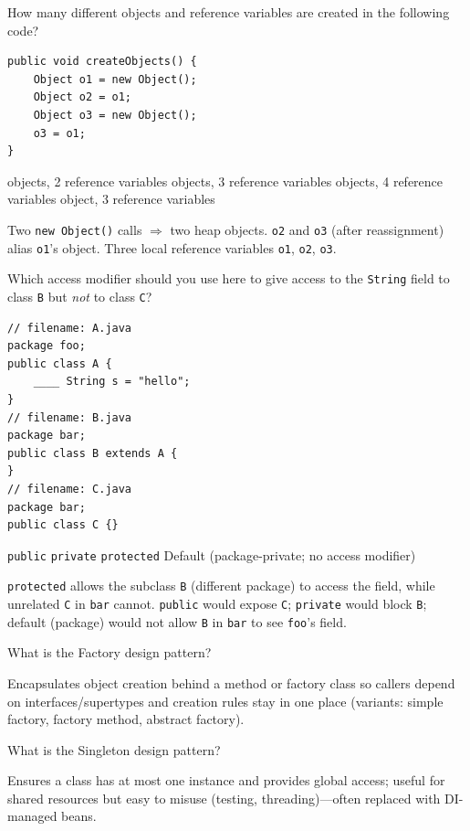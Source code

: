 \question[4]
How many different objects and reference variables are created in the following code?
\begin{lstlisting}[style=java]
public void createObjects() {
    Object o1 = new Object();
    Object o2 = o1;
    Object o3 = new Object();
    o3 = o1;
}
\end{lstlisting}
\begin{choices}
   objects, 2 reference variables
   objects, 3 reference variables
   objects, 4 reference variables
   object, 3 reference variables
\end{choices}
\begin{solution}
  Two \texttt{new Object()} calls $\Rightarrow$ two heap objects. \texttt{o2} and \texttt{o3} (after reassignment) alias \texttt{o1}'s object. Three local reference variables \texttt{o1}, \texttt{o2}, \texttt{o3}.
\end{solution}

\question[4]
Which access modifier should you use here to give access to the \texttt{String} field to class \texttt{B} but \emph{not} to class \texttt{C}?
\begin{lstlisting}[style=java]
// filename: A.java
package foo;
public class A {
    ____ String s = "hello";
}
// filename: B.java
package bar;
public class B extends A {
}
// filename: C.java
package bar;
public class C {}
\end{lstlisting}
\begin{choices}
  \choice \texttt{public}
  \choice \texttt{private}
  \CorrectChoice \texttt{protected}
  \choice Default (package-private; no access modifier)
\end{choices}
\begin{solution}
  \texttt{protected} allows the subclass \texttt{B} (different package) to access the field, while unrelated \texttt{C} in \texttt{bar} cannot. \texttt{public} would expose \texttt{C}; \texttt{private} would block \texttt{B}; default (package) would not allow \texttt{B} in \texttt{bar} to see \texttt{foo}'s field.
\end{solution}

\newpage


\question[4]
What is the Factory design pattern?
\begin{solutionorbox}[1.25in]
  Encapsulates object creation behind a method or factory class so callers depend on interfaces/supertypes and creation rules stay in one place (variants: simple factory, factory method, abstract factory).
\end{solutionorbox}

\question[4]
What is the Singleton design pattern?
\begin{solutionorbox}[1.25in]
  Ensures a class has at most one instance and provides global access; useful for shared resources but easy to misuse (testing, threading)---often replaced with DI-managed beans.
\end{solutionorbox}

